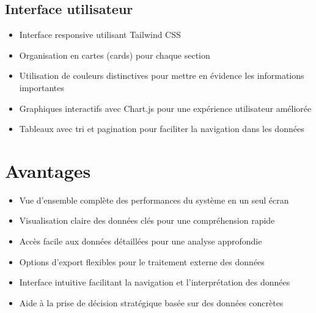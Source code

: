 \documentclass[12pt,a4paper]{article}
\begin{document}
\subsection{Interface utilisateur}
\begin{itemize}
    \item Interface responsive utilisant Tailwind CSS
    \item Organisation en cartes (cards) pour chaque section
    \item Utilisation de couleurs distinctives pour mettre en évidence les informations importantes
    \item Graphiques interactifs avec Chart.js pour une expérience utilisateur améliorée
    \item Tableaux avec tri et pagination pour faciliter la navigation dans les données
\end{itemize}

\section{Avantages}
\begin{itemize}
    \item Vue d'ensemble complète des performances du système en un seul écran
    \item Visualisation claire des données clés pour une compréhension rapide
    \item Accès facile aux données détaillées pour une analyse approfondie
    \item Options d'export flexibles pour le traitement externe des données
    \item Interface intuitive facilitant la navigation et l'interprétation des données
    \item Aide à la prise de décision stratégique basée sur des données concrètes
\end{itemize}
\end{document}
